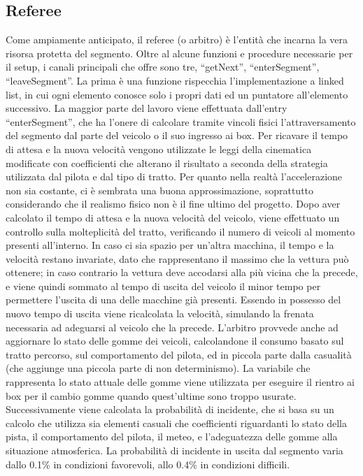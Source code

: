 \subsection{Referee}

Come ampiamente anticipato, il referee (o arbitro) è l’entità che incarna la vera risorsa protetta del segmento. 
Oltre al alcune funzioni e procedure necessarie per il setup, i canali principali che offre sono tre, “getNext”, “enterSegment”, “leaveSegment”.
La prima è una funzione rispecchia l’implementazione a linked list, in cui ogni elemento conosce solo i propri dati ed un puntatore all’elemento successivo.
La maggior parte del lavoro viene effettuata dall’entry “enterSegment”, che ha l’onere di calcolare tramite vincoli fisici l’attraversamento del segmento dal parte del veicolo o il suo ingresso ai box.
Per ricavare il tempo di attesa e la nuova velocità vengono utilizzate le leggi della cinematica modificate con coefficienti che alterano il risultato a seconda della strategia utilizzata dal pilota e dal tipo di tratto. Per quanto nella realtà l’accelerazione non sia costante, ci è sembrata una buona approssimazione, soprattutto considerando che il realismo fisico non è il fine ultimo del progetto.
Dopo aver calcolato il tempo di attesa e la nuova velocità del veicolo, viene effettuato un controllo sulla molteplicità del tratto, verificando il numero di veicoli al momento presenti all’interno. In caso ci sia spazio per un’altra macchina, il tempo e la velocità restano invariate, dato che rappresentano il massimo che la vettura può ottenere; in caso contrario la vettura deve accodarsi alla più vicina che la precede, e viene quindi sommato al tempo di uscita del veicolo il minor tempo per permettere l’uscita di una delle macchine già presenti.
Essendo in possesso del nuovo tempo di uscita viene ricalcolata la velocità, simulando la frenata necessaria ad adeguarsi al veicolo che la precede.
L’arbitro provvede anche ad aggiornare lo stato delle gomme dei veicoli, calcolandone il consumo basato sul tratto percorso, sul comportamento del pilota, ed in piccola parte dalla casualità (che aggiunge una piccola parte di non determinismo). La variabile che rappresenta lo stato attuale delle gomme viene utilizzata per eseguire il rientro ai box per il cambio gomme quando quest’ultime sono troppo usurate.
Successivamente viene calcolata la probabilità di incidente, che si basa su un calcolo che utilizza sia elementi casuali che coefficienti riguardanti lo stato della pista, il comportamento del pilota, il meteo, e l’adeguatezza delle gomme alla situazione atmosferica. La probabilità di incidente in uscita dal segmento varia dallo 0.1\% in condizioni favorevoli, allo 0.4\% in condizioni difficili.
